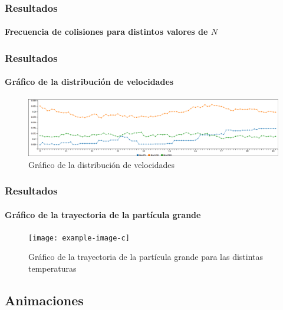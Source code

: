 \documentclass[hyperref={pdfpagelayout=SinglePage}]{beamer}
\begin{document}
\begin{frame}
\frametitle{Resultados}
\framesubtitle{Frecuencia de colisiones para distintos valores de $N$}
\begin{center}
\begin{table}[h]
\centering
{}
\caption{Frecuencia de colisiones para distintos valores de $N$.}
\end{table}
\end{center}
\end{frame}

\begin{frame}
\frametitle{Resultados}
\framesubtitle{Gráfico de la distribución de velocidades}
\begin{figure}[H]
        \centering
        \includegraphics[width=\textwidth]{graphs/velocities.png}
        \caption{Gráfico de la distribución de velocidades}
\end{figure}
\end{frame}

\begin{frame}
\frametitle{Resultados}
\framesubtitle{Gráfico de la trayectoria de la partícula grande}
\begin{figure}[H]
        \centering
        \texttt{[image: example-image-c]}
        \caption{Gráfico de la trayectoria de la partícula grande para las distintas temperaturas}
\end{figure}
\end{frame}

\subsection{Animaciones}
\end{document}
